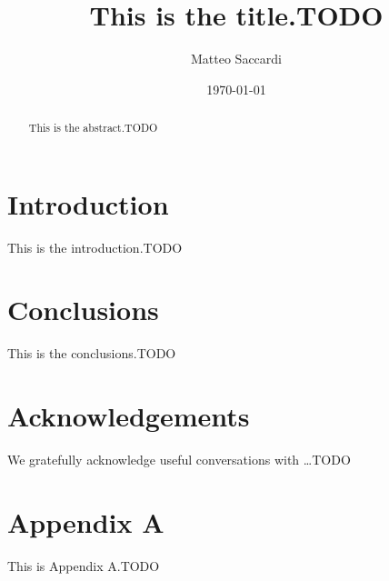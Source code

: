 \documentclass[prd,twocolumn,aps,letterpaper,amsmath,amssymb,preprintnumbers,showpacs,superscriptaddress,floatfix,longbibliography,nofootinbib]{revtex4-2}
\newcommand{\todo}[1]{{\color{red}#1}}    %
\begin{document}
\title{
    This is the title.\todo{TODO}
}
\begin{abstract}
This is the abstract.\todo{TODO}
\end{abstract}

\author{Matteo Saccardi}

\date{\today}

\maketitle

\section{Introduction}
\noindent
This is the introduction.\todo{TODO}

\section{Conclusions}
\noindent
This is the conclusions.\todo{TODO}

\section*{Acknowledgements}

We gratefully acknowledge useful conversations with \dots\todo{TODO}

\clearpage

\appendix

\section{Appendix A}\label{app:A}
\noindent
This is Appendix A.\todo{TODO}

\clearpage

\end{document}
